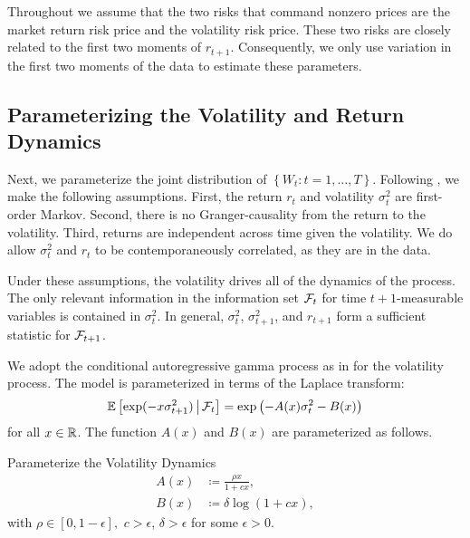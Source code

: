 Throughout we assume that the two risks that command nonzero prices are the market return risk price and the volatility risk price. These two risks are closely related to the first two moments of $r_{t+1}$. Consequently, we only use variation in the first two moments of the data to estimate these parameters. 

\subsection{Parameterizing the Volatility and Return Dynamics}

Next, we parameterize the joint distribution of $\left\lbrace W_t:t=1,\ldots, T\right\rbrace $. 
Following \textcite{han2018leverage}, we make the following assumptions. First, the return $r_t$ and volatility $\sigma^2_t$ are first-order Markov. Second, there is no Granger-causality from the return to the volatility. Third, returns are independent across time given the volatility. We do allow $\sigma^2_{t}$ and $r_{t}$ to be contemporaneously correlated, as they are in the data. 

Under these assumptions, the volatility drives all of the dynamics of the process. The only relevant information in the information set $\mathcal{F}_{t}$ for time $t+1$-measurable variables is contained in $\sigma^2_t$. In general, $\sigma^2_t$, $\sigma^2_{t+1}$, and $r_{t+1}$ form a sufficient statistic for $\mathcal{F}_{t+1}$. 

We adopt the conditional autoregressive gamma process as in \textcite{gourieroux2006autoregressive, han2018leverage} for the volatility process. The model is parameterized in terms of the Laplace transform: 
%
\begin{equation}
    \operatorname{\mathbb{E}}\left[\exp(-x \sigma^2_{t+1}) \,\middle\vert\, \mathcal{F}_{t}\right] = \exp\left(- A(x) \sigma^2_{t} - B(x)\right)
    \label{eqn:vol_laplace_transform}
\end{equation}
%
for all $x \in \mathbb{R}$. The function $A(x)$ and $B(x)$ are parameterized as follows.

\begin{definition}{Parameterize the Volatility Dynamics}
     \label{defn:physical_vol_dynamics}
     \begin{align}
        \label{defn:a_PP}
        A(x) &\coloneqq \frac{\rho x}{1 + c x}, \\
        \label{defn:b_PP}
        B(x) &\coloneqq \delta \log(1 + c x),
     \end{align}
with $\rho \in [0,1-\epsilon],$ $c > \epsilon$, $\delta > \epsilon$ for some $\epsilon > 0$.
\end{definition}

